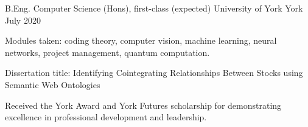 
\begin{cventries}
  \cventry
    {B.Eng. Computer Science (Hons), first-class (expected)} %
    {University of York} %
    {York} %
    {July 2020} %
    {
      \begin{cvitems} %
         \item {Modules taken: coding theory, computer vision, machine learning, neural networks, project management, quantum computation.}
         \vspace{0.5mm}
         \item {Dissertation title: Identifying Cointegrating Relationships Between Stocks using Semantic Web Ontologies} 
         \vspace{0.5mm}
         \item{Received the York Award and York Futures scholarship for demonstrating excellence in professional development and leadership.}
      \end{cvitems}
    }
\end{cventries}
